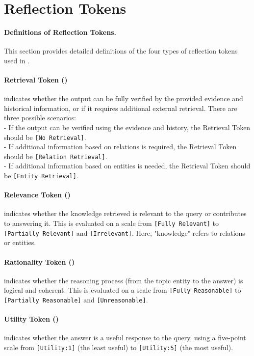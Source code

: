 \section{Reflection Tokens}
\label{sec:appendix}
\paragraph{Definitions of Reflection Tokens.} This section provides detailed definitions of the four types of reflection tokens used in \model.

\paragraph{Retrieval Token (\ret)} indicates whether the output can be fully verified by the provided evidence and historical information, or if it requires additional external retrieval. There are three possible scenarios:\\
- If the output can be verified using the evidence and history, the Retrieval Token should be \texttt{[No Retrieval]}.\\
- If additional information based on relations is required, the Retrieval Token should be \texttt{[Relation Retrieval]}.\\
- If additional information based on entities is needed, the Retrieval Token should be \texttt{[Entity Retrieval]}.

\paragraph{Relevance Token (\crel)} indicates whether the knowledge retrieved is relevant to the query or contributes to answering it. This is evaluated on a scale from \texttt{[Fully Relevant]} to \texttt{[Partially Relevant]} and \texttt{[Irrelevant]}. Here, "knowledge" refers to relations or entities.

\paragraph{Rationality Token (\cre)} indicates whether the reasoning process (from the topic entity to the answer) is logical and coherent. This is evaluated on a scale from \texttt{[Fully Reasonable]} to \texttt{[Partially Reasonable]} and \texttt{[Unreasonable]}.

\paragraph{Utility Token (\cuse)} indicates whether the answer is a useful response to the query, using a five-point scale from \texttt{[Utility:1]} (the least useful) to \texttt{[Utility:5]} (the most useful).

